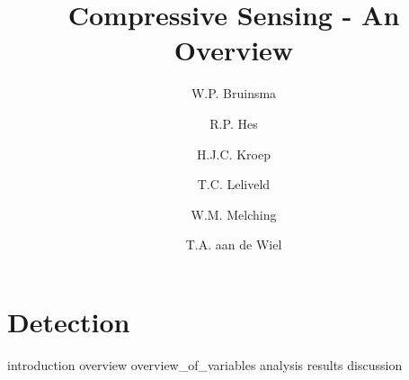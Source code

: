 \documentclass[a4paper, openany, oneside]{memoir}
\title{Compressive Sensing - An Overview}
\author{W.P. Bruinsma \and R.P. Hes \and H.J.C. Kroep \and T.C. Leliveld \and W.M. Melching \and T.A. aan de Wiel}
\begin{document}
\chapter{Detection}

{introduction}
{overview}
{overview_of_variables}
{analysis}
{results}
{discussion}
\end{document}

